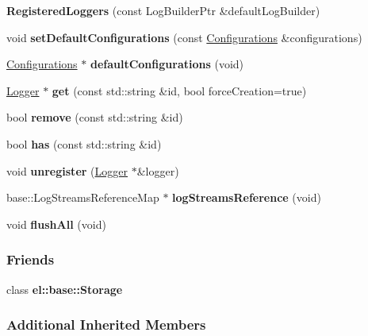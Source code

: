 \begin{DoxyCompactItemize}
\item 
\hypertarget{a00072_ae52ec336770d33fef86f234e4e68dce5}{}{\bfseries Registered\+Loggers} (const Log\+Builder\+Ptr \&default\+Log\+Builder)\label{a00072_ae52ec336770d33fef86f234e4e68dce5}

\item 
\hypertarget{a00072_a28e1f955ad55d89a4ae91fa74545ee4f}{}void {\bfseries set\+Default\+Configurations} (const \hyperlink{a00014}{Configurations} \&configurations)\label{a00072_a28e1f955ad55d89a4ae91fa74545ee4f}

\item 
\hypertarget{a00072_acb38f67cf5e297f4be3efa5312e09914}{}\hyperlink{a00014}{Configurations} $\ast$ {\bfseries default\+Configurations} (void)\label{a00072_acb38f67cf5e297f4be3efa5312e09914}

\item 
\hypertarget{a00072_a8e554505cd7f66d31e91933b61d74144}{}\hyperlink{a00048}{Logger} $\ast$ {\bfseries get} (const std\+::string \&id, bool force\+Creation=true)\label{a00072_a8e554505cd7f66d31e91933b61d74144}

\item 
\hypertarget{a00072_a4d17dc9673f6aa6216571e182097400a}{}bool {\bfseries remove} (const std\+::string \&id)\label{a00072_a4d17dc9673f6aa6216571e182097400a}

\item 
\hypertarget{a00072_a85916925e2c53d1ebf9865625132a0be}{}bool {\bfseries has} (const std\+::string \&id)\label{a00072_a85916925e2c53d1ebf9865625132a0be}

\item 
\hypertarget{a00072_ad8fa8f829fdb6a03e6f5a38704811e7b}{}void {\bfseries unregister} (\hyperlink{a00048}{Logger} $\ast$\&logger)\label{a00072_ad8fa8f829fdb6a03e6f5a38704811e7b}

\item 
\hypertarget{a00072_a11eb24bac74b7ae2d85b324fed707819}{}base\+::\+Log\+Streams\+Reference\+Map $\ast$ {\bfseries log\+Streams\+Reference} (void)\label{a00072_a11eb24bac74b7ae2d85b324fed707819}

\item 
\hypertarget{a00072_abe6fdac67d9d4c35fb48c9fd88a49c2e}{}void {\bfseries flush\+All} (void)\label{a00072_abe6fdac67d9d4c35fb48c9fd88a49c2e}

\end{DoxyCompactItemize}
\subsubsection*{Friends}
\begin{DoxyCompactItemize}
\item 
\hypertarget{a00072_acc1efd1b8a3fc5e0028dab98b02e550a}{}class {\bfseries el\+::base\+::\+Storage}\label{a00072_acc1efd1b8a3fc5e0028dab98b02e550a}

\end{DoxyCompactItemize}
\subsubsection*{Additional Inherited Members}
